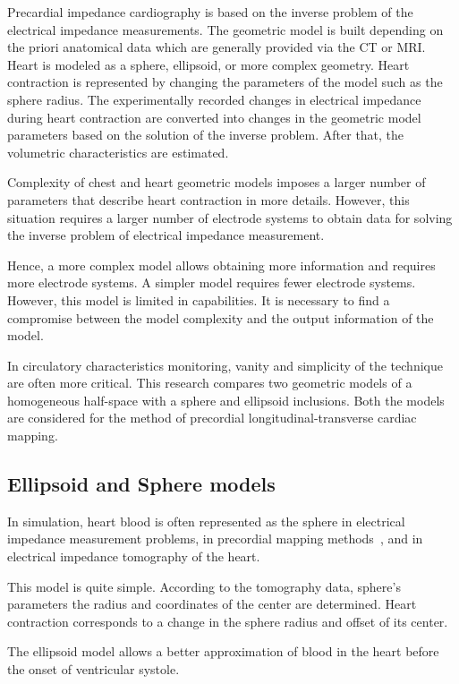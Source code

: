\documentclass[conference]{IEEEtran}
\begin{document}
Precardial impedance cardiography is based on the inverse problem of the electrical impedance measurements.
The geometric model is built depending on the priori anatomical data which are generally provided via the CT or MRI.
Heart is modeled as a sphere, ellipsoid, or more complex geometry.
Heart contraction is represented by changing the parameters of the model such as the sphere radius.
The experimentally recorded changes in electrical impedance during heart contraction are converted into changes in the geometric model parameters based on the solution of the inverse problem.
After that, the volumetric characteristics are estimated.

Complexity of chest and heart geometric models imposes a larger number of parameters that describe heart contraction in more details.
However, this situation requires a larger number of electrode systems to obtain data for solving the inverse problem of electrical impedance measurement.

Hence, a more complex model allows obtaining more information and requires more electrode systems.
A simpler model requires fewer electrode systems.
However, this model is limited in capabilities.
It is necessary to find a compromise between the model complexity and the output information of the model.

In circulatory characteristics monitoring, vanity and simplicity of the technique are often more critical.
This research compares two geometric models of a homogeneous half-space with a sphere and ellipsoid inclusions.
Both the models are considered for the method of precordial longitudinal-transverse cardiac mapping.

\subsection{Ellipsoid and Sphere models}

In simulation, heart blood is often represented as the sphere in electrical impedance measurement problems, in precordial mapping methods~\cite{Tikhomirov2019}, and in electrical impedance tomography of the heart.

This model is quite simple.
According to the tomography data, sphere’s parameters the radius and coordinates of the center are determined.
Heart contraction corresponds to a change in the sphere radius and offset of its center.

The ellipsoid model allows a better approximation of blood in the heart before the onset of ventricular systole.
\end{document}
